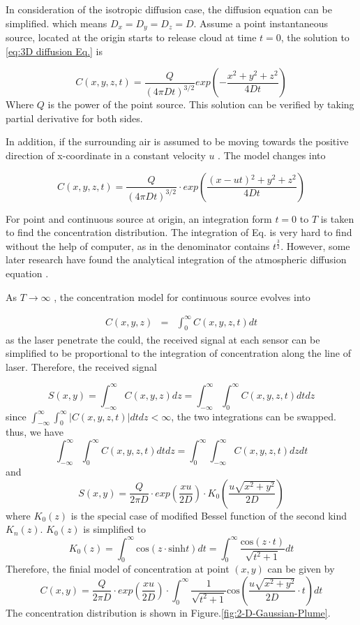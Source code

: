 In consideration of the isotropic diffusion case, the diffusion equation
can be simplified. which means $D_{x}=D_{y}=D_{z}=D$. Assume a point
instantaneous source, located at the origin starts to release cloud
at time $t=0$, the solution to \ref{eq:3D diffusion Eq.} is 

\begin{equation}
C(x,y,z,t)=\frac{Q}{\left(4\pi Dt\right)^{3/2}}exp\left(-\frac{x{}^{2}+y^{2}+z^{2}}{4Dt}\right)
\end{equation}
Where $Q$ is the power of the point source. This solution can be
verified by taking partial derivative for both sides.

In addition, if the surrounding air is assumed to be moving towards
the positive direction of x-coordinate in a constant velocity $u$
. The model changes into

\begin{equation}
C(x,y,z,t)=\frac{Q}{\left(4\pi Dt\right)^{3/2}}\cdot exp\left(\frac{(x-ut){}^{2}+y^{2}+z^{2}}{4Dt}\right)\label{eq:3D point Model}
\end{equation}


For point and continuous source at origin, an integration form $t=0$
to $T$ is taken to find the concentration distribution. The integration
of Eq. is very hard to find without
the help of computer, as in the denominator contains $t^{\frac{3}{2}}$.
However, some later research have found the analytical integration
of the atmospheric diffusion equation \cite{Lin1996}. 

As $T\rightarrow\infty$ , the concentration model for continuous
source evolves into

\begin{eqnarray}
C(x,y,z) & = & \int_{0}^{\infty}C(x,y,z,t)dt
\end{eqnarray}
as the laser penetrate the could, the received signal at each sensor
can be simplified to be proportional to the integration of concentration
along the line of laser. Therefore, the received signal 

\[
S(x,y)=\int_{-\infty}^{\infty}C(x,y,z)dz=\int_{-\infty}^{\infty}\int_{0}^{\infty}C(x,y,z,t)dtdz
\]
since $\int_{-\infty}^{\infty}\int_{0}^{\infty}\left|C(x,y,z,t)\right|dtdz<\infty$,
the two integrations can be swapped. thus, we have 
\[
\int_{-\infty}^{\infty}\int_{0}^{\infty}C(x,y,z,t)dtdz=\int_{0}^{\infty}\int_{-\infty}^{\infty}C(x,y,z,t)dzdt
\]
and 
\[
S(x,y)=\frac{Q}{2\pi D}\cdot exp\left(\frac{xu}{2D}\right)\cdot K_{0}\left(\frac{u\sqrt{x^{2}+y^{2}}}{2D}\right)
\]
where $K_{0}(z)$ is the special case of modified Bessel function
of the second kind $K_{n}(z)$. $K_{0}(z)$ is simplified to 
\[
K_{0}(z)=\int_{0}^{\infty}\mbox{cos}(z\cdot\mbox{sinh}t)dt=\int_{0}^{\infty}\frac{\mbox{cos}(z\cdot t)}{\sqrt{t^{2}+1}}dt
\]
Therefore, the finial model of concentration at point $\left(x,y\right)$
can be given by 
\[
C(x,y)=\frac{Q}{2\pi D}\cdot exp\left(\frac{xu}{2D}\right)\cdot\int_{0}^{\infty}\frac{1}{\sqrt{t^{2}+1}}\mbox{cos}(\frac{u\sqrt{x^{2}+y^{2}}}{2D}\cdot t)dt
\]
The concentration distribution is shown in Figure.\ref{fig:2-D-Gaussian-Plume}.

